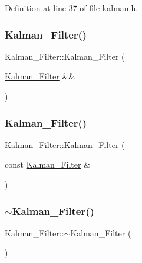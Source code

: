 Definition at line 37 of file kalman.\+h.

\mbox{\label{class_kalman___filter_ad7218294c69e625015c505c30072839c}} 
\subsubsection{\texorpdfstring{Kalman\_Filter()}{Kalman\_Filter()}\hspace{0.1cm}{\footnotesize\ttfamily [2/3]}}
{\footnotesize\ttfamily Kalman\+\_\+\+Filter\+::\+Kalman\+\_\+\+Filter (\begin{DoxyParamCaption}\item[{\mbox{\hyperlink{class_kalman___filter}{Kalman\+\_\+\+Filter}} \&\&}]{ }\end{DoxyParamCaption})\hspace{0.3cm}{\ttfamily [default]}}

\mbox{\label{class_kalman___filter_aaecd5f0a2c95443770f1e96e6d6ae901}} 
\subsubsection{\texorpdfstring{Kalman\_Filter()}{Kalman\_Filter()}\hspace{0.1cm}{\footnotesize\ttfamily [3/3]}}
{\footnotesize\ttfamily Kalman\+\_\+\+Filter\+::\+Kalman\+\_\+\+Filter (\begin{DoxyParamCaption}\item[{const \mbox{\hyperlink{class_kalman___filter}{Kalman\+\_\+\+Filter}} \&}]{ }\end{DoxyParamCaption})\hspace{0.3cm}{\ttfamily [default]}}

\mbox{\label{class_kalman___filter_ae28ab3bf701a35f7c1be1a8ce9e58ab8}} 
\subsubsection{\texorpdfstring{$\sim$Kalman\_Filter()}{~Kalman\_Filter()}}
{\footnotesize\ttfamily Kalman\+\_\+\+Filter\+::$\sim$\+Kalman\+\_\+\+Filter (\begin{DoxyParamCaption}{ }\end{DoxyParamCaption})\hspace{0.3cm}{\ttfamily [inline]}}



